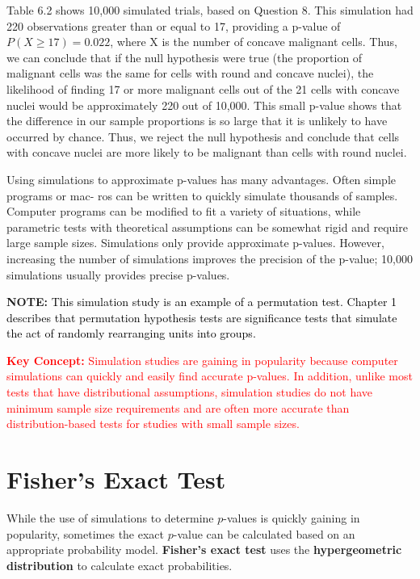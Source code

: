 \documentclass[
]{report}
\begin{document}
Table 6.2 shows 10,000 simulated trials, based on Question 8. This simulation had 220 observations
greater than or equal to 17, providing a p-value of \(P(X \geq 17)= 0.022\), where X is the number of concave
malignant cells. Thus, we can conclude that if the null hypothesis were true (the proportion of malignant cells
was the same for cells with round and concave nuclei), the likelihood of finding 17 or more malignant cells
out of the 21 cells with concave nuclei would be approximately 220 out of 10,000. This small p-value shows
that the difference in our sample proportions is so large that it is unlikely to have occurred by chance. Thus,
we reject the null hypothesis and conclude that cells with concave nuclei are more likely to be malignant than
cells with round nuclei.

Using simulations to approximate p-values has many advantages. Often simple programs or mac-
ros can be written to quickly simulate thousands of samples. Computer programs can be modified to
fit a variety of situations, while parametric tests with theoretical assumptions can be somewhat rigid
and require large sample sizes. Simulations only provide approximate p-values. However, increasing
the number of simulations improves the precision of the p-value; 10,000 simulations usually provides
precise p-values.

\large

\textbf{NOTE:}
\textcolor{black}{This simulation study is an example of a permutation test. Chapter 1 describes that permutation hypothesis
tests are significance tests that simulate the act of randomly rearranging units into groups.}
\normalsize

\Large

\textbf{\textcolor{red}{Key Concept:}}
\textcolor{red}{Simulation studies are gaining in popularity because computer simulations can quickly and easily find
accurate p-values. In addition, unlike most tests that have distributional assumptions, simulation studies
do not have minimum sample size requirements and are often more accurate than distribution-based
tests for studies with small sample sizes.}
\normalsize

\section{\texorpdfstring{\textbf{Fisher's Exact Test}}{Fisher's Exact Test}}\label{fishers-exact-test}

While the use of simulations to determine \(p\)-values is quickly gaining in popularity, sometimes the exact \(p\)-value can be calculated based on an appropriate probability model. \textbf{Fisher's exact test} uses the \textbf{hypergeometric distribution} to calculate exact probabilities.
\end{document}
